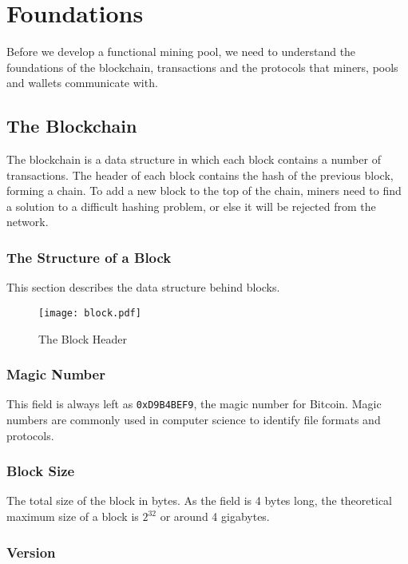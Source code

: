 \section{Foundations}

Before we develop a functional mining pool, we need to understand the foundations of the blockchain, transactions and the protocols that miners, pools and wallets communicate with.

\subsection{The Blockchain}

The blockchain is a data structure in which each block contains a number of transactions. The header of each block contains the hash of the previous block, forming a chain. To add a new block to the top of the chain, miners need to find a solution to a difficult hashing problem, or else it will be rejected from the network.

\subsubsection{The Structure of a Block}

This section describes the data structure behind blocks.

\begin{figure}[h]
    \centering
    \texttt{[image: block.pdf]}
    \caption{The Block Header}
    \label{fig:block_header}
\end{figure}

\subsubsection{Magic Number}

This field is always left as \texttt{0xD9B4BEF9}, the magic number for Bitcoin. Magic numbers are commonly used in computer science to identify file formats and protocols. 

\subsubsection{Block Size}

The total size of the block in bytes. As the field is 4 bytes long, the theoretical maximum size of a block is $2^{32}$ or around 4 gigabytes.

\subsubsection{Version}

